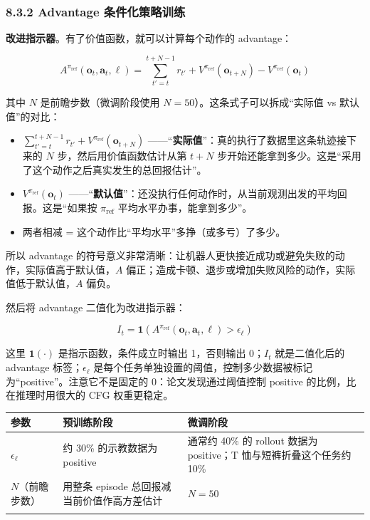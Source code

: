 \documentclass[
  chinese,
]{ctexart}
\providecommand{\tightlist}{%
  \setlength{\itemsep}{0pt}\setlength{\parskip}{0pt}}
\begin{document}
\subsubsection{8.3.2 Advantage
条件化策略训练}\label{advantage-ux6761ux4ef6ux5316ux7b56ux7565ux8badux7ec3}

\textbf{改进指示器}。有了价值函数，就可以计算每个动作的 advantage：

\[
A^{\pi_\text{ref}}(\mathbf{o}_t, \mathbf{a}_t, \ell) = \sum_{t'=t}^{t+N-1} r_{t'} + V^{\pi_\text{ref}}(\mathbf{o}_{t+N}) - V^{\pi_\text{ref}}(\mathbf{o}_t)
\]

其中 \(N\) 是前瞻步数（微调阶段使用 \(N=50\)）。这条式子可以拆成``实际值
vs 默认值''的对比：

\begin{itemize}
\tightlist
\item
  \(\sum_{t'=t}^{t+N-1} r_{t'} + V^{\pi_\text{ref}}(\mathbf{o}_{t+N})\)
  ------``\textbf{实际值}''：真的执行了数据里这条轨迹接下来的 \(N\)
  步，然后用价值函数估计从第 \(t+N\)
  步开始还能拿到多少。这是``采用了这个动作之后真实发生的总回报估计''。
\item
  \(V^{\pi_\text{ref}}(\mathbf{o}_t)\)
  ------``\textbf{默认值}''：还没执行任何动作时，从当前观测出发的平均回报。这是``如果按
  \(\pi_\text{ref}\) 平均水平办事，能拿到多少''。
\item
  两者相减 = 这个动作比``平均水平''多挣（或多亏）了多少。
\end{itemize}

所以 advantage
的符号意义非常清晰：让机器人更快接近成功或避免失败的动作，实际值高于默认值，\(A\)
偏正；造成卡顿、退步或增加失败风险的动作，实际值低于默认值，\(A\) 偏负。

然后将 advantage 二值化为改进指示器：

\[
I_t = \mathbf{1}\!\left(A^{\pi_\text{ref}}(\mathbf{o}_t, \mathbf{a}_t, \ell) > \epsilon_\ell\right)
\]

这里 \(\mathbf{1}(\cdot)\) 是指示函数，条件成立时输出 1，否则输出
0；\(I_t\) 就是二值化后的 advantage 标签；\(\epsilon_\ell\)
是每个任务单独设置的阈值，控制多少数据被标记为``positive''。注意它不是固定的
0：论文发现通过阈值控制 positive 的比例，比在推理时用很大的 CFG
权重更稳定。

\begin{center}
\begin{tabular}{@{}>{\raggedright\arraybackslash}p{} >{\raggedright\arraybackslash}p{} >{\raggedright\arraybackslash}p{}@{}}
\toprule\noalign{}
参数 & 预训练阶段 & 微调阶段 \\
\midrule\noalign{}
\(\epsilon_\ell\) & 约 30\% 的示教数据为 positive & 通常约 40\% 的 rollout 数据为 positive；T 恤与短裤折叠这个任务约 10\% \\
\(N\)（前瞻步数） & 用整条 episode 总回报减当前价值作高方差估计 & \(N = 50\) \\
\bottomrule\noalign{}
\end{tabular}
\end{center}
\end{document}
